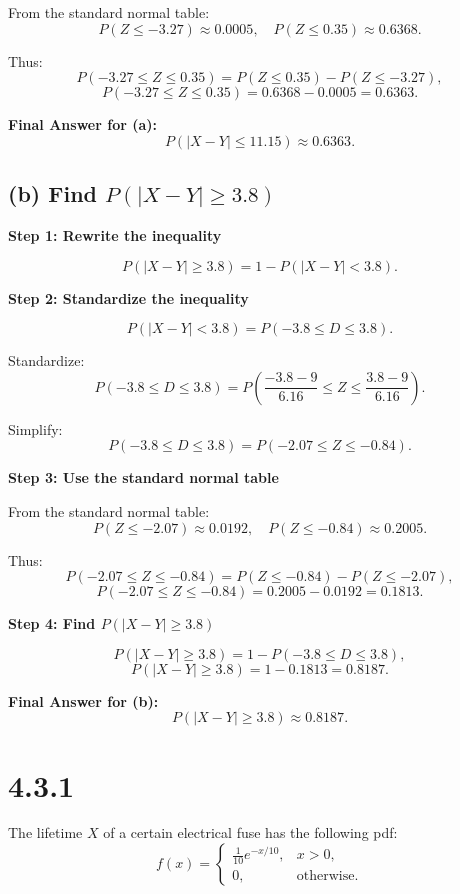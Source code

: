 \documentclass{article}
\begin{document}
From the standard normal table:
\[
P(Z \leq -3.27) \approx 0.0005, \quad P(Z \leq 0.35) \approx 0.6368.
\]

Thus:
\[
P(-3.27 \leq Z \leq 0.35) = P(Z \leq 0.35) - P(Z \leq -3.27),
\]
\[
P(-3.27 \leq Z \leq 0.35) = 0.6368 - 0.0005 = 0.6363.
\]

\textbf{Final Answer for (a):}
\[
P(|X - Y| \leq 11.15) \approx 0.6363.
\]

\subsection*{(b) Find $P(|X - Y| \geq 3.8)$}

\textbf{Step 1: Rewrite the inequality}

\[
P(|X - Y| \geq 3.8) = 1 - P(|X - Y| < 3.8).
\]

\textbf{Step 2: Standardize the inequality}

\[
P(|X - Y| < 3.8) = P(-3.8 \leq D \leq 3.8).
\]

Standardize:
\[
P(-3.8 \leq D \leq 3.8) = P\left(\frac{-3.8 - 9}{6.16} \leq Z \leq \frac{3.8 - 9}{6.16}\right).
\]

Simplify:
\[
P(-3.8 \leq D \leq 3.8) = P(-2.07 \leq Z \leq -0.84).
\]

\textbf{Step 3: Use the standard normal table}

From the standard normal table:
\[
P(Z \leq -2.07) \approx 0.0192, \quad P(Z \leq -0.84) \approx 0.2005.
\]

Thus:
\[
P(-2.07 \leq Z \leq -0.84) = P(Z \leq -0.84) - P(Z \leq -2.07),
\]
\[
P(-2.07 \leq Z \leq -0.84) = 0.2005 - 0.0192 = 0.1813.
\]

\textbf{Step 4: Find $P(|X - Y| \geq 3.8)$}

\[
P(|X - Y| \geq 3.8) = 1 - P(-3.8 \leq D \leq 3.8),
\]
\[
P(|X - Y| \geq 3.8) = 1 - 0.1813 = 0.8187.
\]

\textbf{Final Answer for (b):}
\[
P(|X - Y| \geq 3.8) \approx 0.8187.
\]


\section*{4.3.1}

The lifetime $X$ of a certain electrical fuse has the following pdf:
\[
f(x) = 
\begin{cases} 
\frac{1}{10}e^{-x/10}, & x > 0, \\
0, & \text{otherwise}.
\end{cases}
\]
\end{document}

